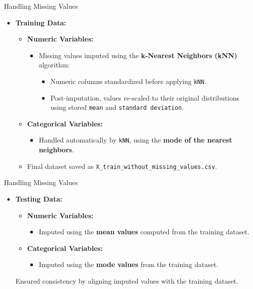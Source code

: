 \documentclass{beamer}
\begin{document}
\begin{frame}{Handling Missing Values}
    \begin{itemize}
        \item \textbf{Training Data:}
        \begin{itemize}
            \item \textbf{Numeric Variables:}
            \begin{itemize}
                \item Missing values imputed using the \textbf{k-Nearest Neighbors (kNN)} algorithm:
                \begin{itemize}
                    \item Numeric columns standardized before applying \texttt{kNN}.
                    \item Post-imputation, values re-scaled to their original distributions using stored \texttt{mean} and \texttt{standard deviation}.
                \end{itemize}
            \end{itemize}
    \item \textbf{Categorical Variables:}
            \begin{itemize}
                \item Handled automatically by \texttt{kNN}, using the \textbf{mode of the nearest neighbors}.
            \end{itemize}
            \item Final dataset saved as \texttt{X\_train\_without\_missing\_values.csv}.
        \end{itemize}

    \end{itemize}
\end{frame}

\begin{frame}{Handling Missing Values}
    \begin{itemize}
        \item \textbf{Testing Data:}
        \begin{itemize}
            \item \textbf{Numeric Variables:}
            \begin{itemize}
                \item Imputed using the \textbf{mean values} computed from the training dataset.
            \end{itemize}
        \item \textbf{Categorical Variables:}
            \begin{itemize}
                \item Imputed using the \textbf{mode values} from the training dataset.
            \end{itemize}
        \end{itemize}
        Ensured consistency by aligning imputed values with the training dataset.
\end{itemize}
\end{frame}
\end{document}
